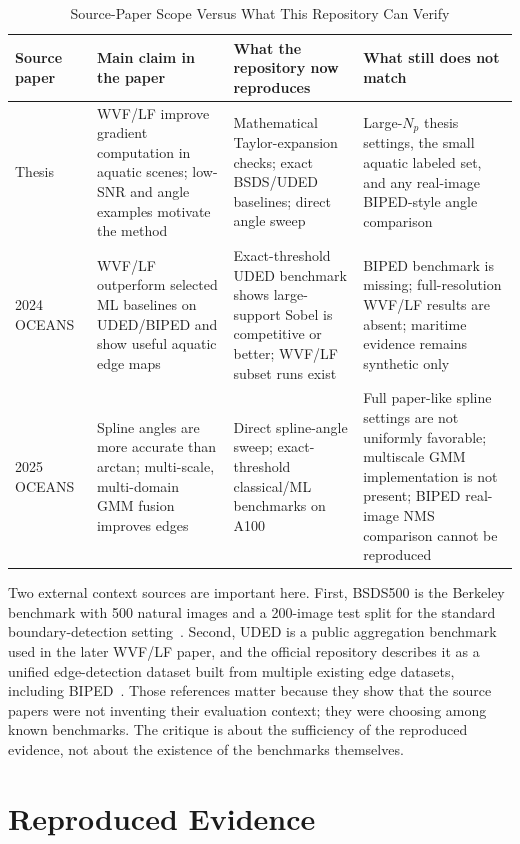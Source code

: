 \documentclass[conference]{IEEEtran}
\begin{document}
\begin{table}[t]
\centering
\caption{Source-Paper Scope Versus What This Repository Can Verify}
\label{tab:scope}
\scriptsize
\begin{tabular}{P{2.3cm}P{4.1cm}P{4.5cm}P{4.3cm}}
\toprule
Source paper & Main claim in the paper & What the repository now reproduces & What still does not match \\
\midrule
Thesis~\cite{bagan2023thesis} & WVF/LF improve gradient computation in aquatic scenes; low-SNR and angle examples motivate the method & Mathematical Taylor-expansion checks; exact BSDS/UDED baselines; direct angle sweep & Large-$N_p$ thesis settings, the small aquatic labeled set, and any real-image BIPED-style angle comparison \\
2024 OCEANS~\cite{bagan2024oceans} & WVF/LF outperform selected ML baselines on UDED/BIPED and show useful aquatic edge maps & Exact-threshold UDED benchmark shows large-support Sobel is competitive or better; WVF/LF subset runs exist & BIPED benchmark is missing; full-resolution WVF/LF results are absent; maritime evidence remains synthetic only \\
2025 OCEANS~\cite{bagan2025oceans} & Spline angles are more accurate than arctan; multi-scale, multi-domain GMM fusion improves edges & Direct spline-angle sweep; exact-threshold classical/ML benchmarks on A100 & Full paper-like spline settings are not uniformly favorable; multiscale GMM implementation is not present; BIPED real-image NMS comparison cannot be reproduced \\
\bottomrule
\end{tabular}
\end{table}

Two external context sources are important here. First, BSDS500 is the Berkeley benchmark with 500 natural images and a 200-image test split for the standard boundary-detection setting~\cite{bsds500_official,arbelaez2011}. Second, UDED is a public aggregation benchmark used in the later WVF/LF paper, and the official repository describes it as a unified edge-detection dataset built from multiple existing edge datasets, including BIPED~\cite{uded_repo}. Those references matter because they show that the source papers were not inventing their evaluation context; they were choosing among known benchmarks. The critique is about the sufficiency of the reproduced evidence, not about the existence of the benchmarks themselves.

\section{Reproduced Evidence}
\end{document}
